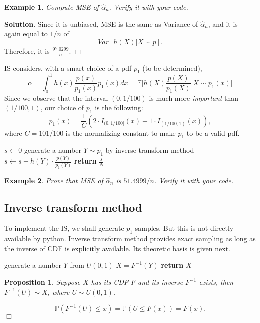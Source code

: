 \documentclass{article}
\newtheorem{proposition}[theorem]{Proposition}
\newtheorem{example}{Example}
\newenvironment{proof}{\noindent {\sc Proof:}}{$\Box$} %
\begin{document}
\begin{example}
 Compute MSE of $\hat \alpha_{n}$. Verify it with your code.
\end{example}
{\bf Solution}.
Since it is unbiased, MSE is the same as Variance of $\hat \alpha_{n}$, 
and it is again equal to $1/n$ of 
$$Var[h(X) | X\sim p].
$$Therefore, it is
$\frac{97.0299}{n}$. \hfill $\Box$


IS considers, with a smart choice of a pdf $p_{1}$ (to be determined), 
$$\alpha = \int_{0}^{1} h(x)\frac{p(x)}{p_{1}(x)} p_{1} (x) dx= 
\mathbb E \Big[h(X) \frac{p(X)}{p_{1}(X)} \Big| X\sim p_{1}(x) \Big] $$
Since we observe that the interval $(0, 1/100)$ is much more {\it important}
than $(1/100, 1)$, our choice of $p_{1}$ is the following:
$$p_{1} (x) = \frac{1}{C} (2 \cdot I_{(0, 1/100]} (x) + 1 \cdot I_{(1/100, 1)}(x)),$$
where
$C = 101/100$ is the normalizing constant to make $p_{1}$ to be a valid pdf.

\begin{algorithm}\label{pc:is}
\caption{Integral by importance sampling - Example \ref{ex:integral}}
\label{alg:mcpi}
\begin{algorithmic}[1]
\State  $s \gets 0$ 
	\State generate a number $Y \sim p_1$ by inverse transform method 
	\State $s\gets s+ h(Y) \cdot \frac{p(Y)}{p_1(Y)}$ 
\EndFor
\State \textbf{return} $\frac{s}{N}$ 
\EndProcedure
\end{algorithmic}
\end{algorithm}

 


\begin{example}
 Prove that MSE of $\hat \alpha_{n}$ is $51.4999/n$. Verify it with your code.
\end{example}

\subsection{Inverse transform method}
To implement the IS, we  shall generate $p_{1}$ samples.
But this is not directly available by python. 
Inverse transform method provides exact sampling as long as the inverse of CDF is explicitly available. Its theoretic basis is given next.

\begin{algorithm}\label{pc:itm}
\caption{ITM sample generation for $X\sim F$ given $F^{-1}$}
\label{alg:mcpi}
\begin{algorithmic}[1]
\State generate a number $Y$ from $U(0,1)$ 
\State $X = F^{-1}(Y)$
\State \textbf{return} $X$ 
\EndProcedure
\end{algorithmic}
\end{algorithm}


\begin{proposition}
 Suppose $X$ has its CDF $F$ and its inverse $F^{-1}$ exists, then 
 $F^{-1}(U) \sim X$, where $U\sim U(0,1)$.
\end{proposition}
\begin{proof}
 $$\mathbb P(F^{-1}(U) \le x) = \mathbb P(U\le F(x)) = F(x).$$
\end{proof}
\end{document}

